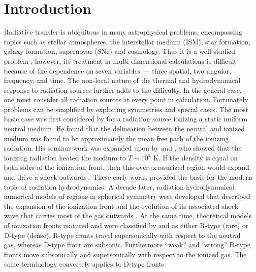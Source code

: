 \documentclass[12pt,preprint]{aastex}
\begin{document}

\section{Introduction}

Radiative transfer is ubiquitous in many astrophysical problems,
encompassing topics such as stellar atmospheres, the interstellar
medium (ISM), star formation, galaxy formation, supernovae (SNe) and
cosmology.  Thus it is a well-studied problem
\citep[e.g.][]{Mathews65, Rybicki, Mihalas84, Yorke86}; however, its
treatment in multi-dimensional calculations is difficult because of
the dependence on seven variables --- three spatial, two angular,
frequency, and time.  The non-local nature of the thermal and
hydrodynamical response to radiation sources further adds to the
difficulty.  In the general case, one must consider all radiation
sources at every point in calculation.  Fortunately problems can be
simplified by exploiting symmetries and special cases.  The most basic
case was first considered by \citet{Stroemgren39} for a radiation
source ionizing a static uniform neutral medium.  He found that the
delineation between the neutral and ionized medium was found to be
approximately the mean free path of the ionizing radiation.  His
seminar work was expanded upon by \citet{Spitzer48, Spitzer49,
  Spitzer54} and \citet{Spitzer50}, who showed that the ionizing
radiation heated the medium to $T \sim 10^4$ K.  If the density is
equal on both sides of the ionization front, then this
over-pressurized region would expand and drive a shock outwards
\citep[e.g.][]{Oort54, Schatzman55}.  These early works provided the
basis for the modern topic of radiation hydrodynamics.  A decade
later, radiation hydrodynamical numerical models of  regions
in spherical symmetry were developed that described the expansion of
the ionization front and the evolution of its associated shock wave
that carries most of the gas outwards \citep[e.g.][]{Mathews65,
  Lasker66, Hjellming66}.  At the same time, theoretical models of
ionization fronts matured and were classified by \citet{Kahn54} and
\citet{Axford61} as either R-type (rare) or D-type (dense).  R-type
fronts travel supersonically with respect to the neutral gas, whereas
D-type front are subsonic.  Furthermore ``weak'' and ``strong'' R-type
fronts move subsonically and supersonically with respect to the
ionized gas.  The same terminology conversely applies to D-type
fronts.
\end{document}
